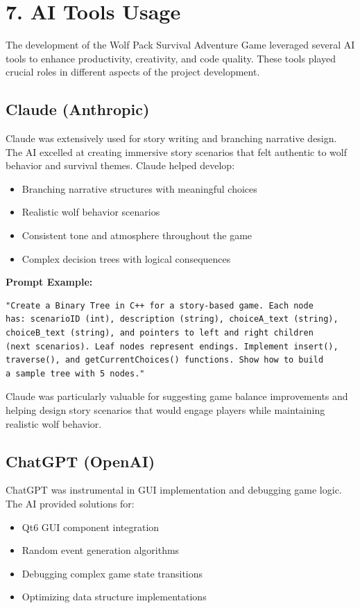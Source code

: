 \documentclass[12pt,a4paper]{article}
\begin{document}
\section[7. AI Tools Usage]{7. AI Tools Usage}

The development of the Wolf Pack Survival Adventure Game leveraged several AI tools to enhance productivity, creativity, and code quality. These tools played crucial roles in different aspects of the project development.

\subsection{Claude (Anthropic)}
Claude was extensively used for story writing and branching narrative design. The AI excelled at creating immersive story scenarios that felt authentic to wolf behavior and survival themes. Claude helped develop:
\begin{itemize}
	\item Branching narrative structures with meaningful choices
	\item Realistic wolf behavior scenarios
	\item Consistent tone and atmosphere throughout the game
	\item Complex decision trees with logical consequences
\end{itemize}

\textbf{Prompt Example:}
\begin{verbatim}
"Create a Binary Tree in C++ for a story-based game. Each node
has: scenarioID (int), description (string), choiceA_text (string),
choiceB_text (string), and pointers to left and right children
(next scenarios). Leaf nodes represent endings. Implement insert(),
traverse(), and getCurrentChoices() functions. Show how to build
a sample tree with 5 nodes."
\end{verbatim}

Claude was particularly valuable for suggesting game balance improvements and helping design story scenarios that would engage players while maintaining realistic wolf behavior.

\subsection{ChatGPT (OpenAI)}
ChatGPT was instrumental in GUI implementation and debugging game logic. The AI provided solutions for:
\begin{itemize}
	\item Qt6 GUI component integration
	\item Random event generation algorithms
	\item Debugging complex game state transitions
	\item Optimizing data structure implementations
\end{itemize}
\end{document}

